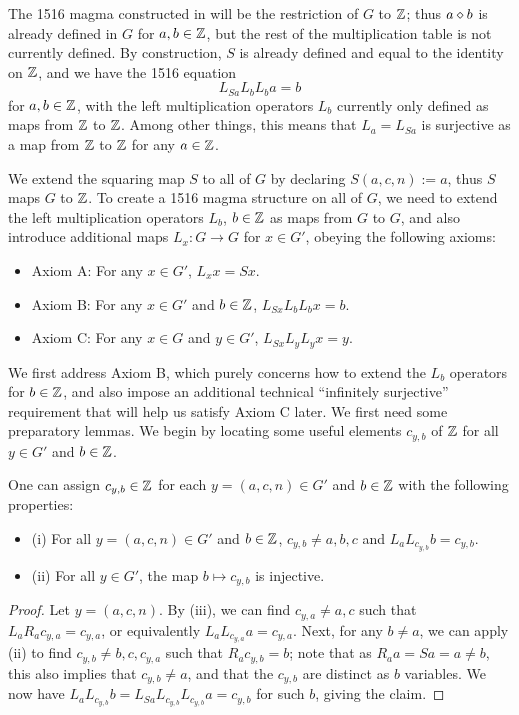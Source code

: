 The 1516 magma constructed in  will be the restriction of $G$ to $\mathbb{Z}$; thus $a \diamond b$ is already defined in $G$ for $a,b \in \mathbb{Z}$, but the rest of the multiplication table is not currently defined.  By construction, $S$ is already defined and equal to the identity on $\mathbb{Z}$, and we have the 1516 equation
$$ L_{Sa} L_b L_b a = b$$
for $a,b \in \mathbb{Z}$, with the left multiplication operators $L_b$ currently only defined as maps from $\mathbb{Z}$ to $\mathbb{Z}$.  Among other things, this means that $L_a = L_{Sa}$ is surjective as a map from $\mathbb{Z}$ to $\mathbb{Z}$ for any $a \in \mathbb{Z}$.

We extend the squaring map $S$ to all of $G$ by declaring $S(a,c,n) := a$, thus $S$ maps $G$ to $\mathbb{Z}$.  To create a 1516 magma structure on all of $G$, we need to extend the left multiplication operators $L_b$, $b \in \mathbb{Z}$ as maps from $G$ to $G$, and also introduce additional maps $L_x: G \to G$ for $x \in G'$, obeying the following axioms:

\begin{itemize}
\item Axiom A: For any $x \in G'$, $L_x x = Sx$.
\item Axiom B: For any $x \in G'$ and $b \in \mathbb{Z}$, $L_{Sx} L_b L_b x = b$.
\item Axiom C: For any $x \in G$ and $y \in G'$, $L_{Sx} L_y L_y x = y$.
\end{itemize}

We first address Axiom B, which purely concerns how to extend the $L_b$ operators for $b \in \mathbb{Z}$, and also impose an additional technical ``infinitely surjective'' requirement that will help us satisfy Axiom C later.  We first need some preparatory lemmas.  We begin by locating some useful elements $c_{y,b}$ of $\mathbb{Z}$ for all $y \in G'$ and $b \in \mathbb{Z}$.

\begin{lemma}\label{aux}  One can assign $c_{y,b} \in \mathbb{Z}$ for each $y = (a,c,n) \in G'$ and $b \in \mathbb{Z}$ with the following properties:
\begin{itemize}
\item (i)  For all $y = (a,c,n) \in G'$ and $b \in \mathbb{Z}$, $c_{y,b} \neq a,b,c$ and $L_a L_{c_{y,b}} b = c_{y,b}$.
\item (ii) For all $y \in G'$, the map $b \mapsto c_{y,b}$ is injective.
\end{itemize}

\end{lemma}

\begin{proof}  Let $y = (a,c,n)$.  By  (iii), we can find $c_{y,a} \neq a,c$ such that $L_a R_a c_{y,a} = c_{y,a}$, or equivalently $L_a L_{c_{y,a}} a = c_{y,a}$.  Next, for any $b \neq a$, we can apply  (ii) to find $c_{y,b} \neq b, c, c_{y,a}$ such that $R_a c_{y,b} = b$; note that as $R_a a = Sa = a \neq b$, this also implies that $c_{y,b} \neq a$, and that the $c_{y,b}$ are distinct as $b$ variables.  We now have $L_a L_{c_{y,b}} b = L_{Sa} L_{c_{y,b}} L_{c_{y,b}} a = c_{y,b}$ for such $b$, giving the claim.
\end{proof}

